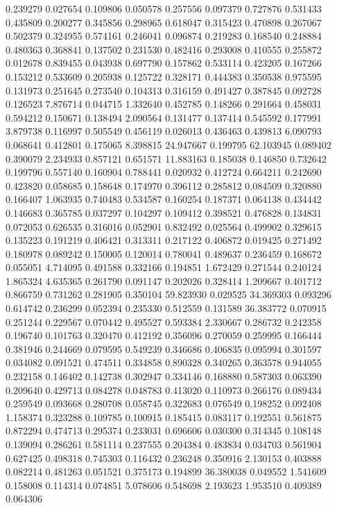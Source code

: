 0.239279
0.027654
0.109806
0.050578
0.257556
0.097379
0.727876
0.531433
0.435809
0.200277
0.345856
0.298965
0.618047
0.315423
0.470898
0.267067
0.502379
0.324955
0.574161
0.246041
0.096874
0.219283
0.168540
0.248884
0.480363
0.368841
0.137502
0.231530
0.482416
0.293008
0.410555
0.255872
0.012678
0.839455
0.043938
0.697790
0.157862
0.533114
0.423205
0.167266
0.153212
0.533609
0.205938
0.125722
0.328171
0.444383
0.350538
0.975595
0.131973
0.251645
0.273540
0.104313
0.316159
0.491427
0.387845
0.092728
0.126523
7.876714
0.044715
1.332640
0.452785
0.148266
0.291664
0.458031
0.594212
0.150671
0.138494
2.090564
0.131477
0.137414
0.545592
0.177991
3.879738
0.116997
0.505549
0.456119
0.026013
0.436463
0.439813
6.090793
0.068641
0.412801
0.175065
8.398815
24.947667
0.199795
62.103945
0.089402
0.390079
2.234933
0.857121
0.651571
11.883163
0.185038
0.146850
0.732642
0.199796
0.557140
0.160904
0.788441
0.020932
0.412724
0.664211
0.242690
0.423820
0.058685
0.158648
0.174970
0.396112
0.285812
0.084509
0.320880
0.166407
1.063935
0.740483
0.534587
0.160254
0.187371
0.064138
0.434442
0.146683
0.365785
0.037297
0.104297
0.109412
0.398521
0.476828
0.134831
0.072053
0.626535
0.316016
0.052901
0.832492
0.025564
0.499902
0.329615
0.135223
0.191219
0.406421
0.313311
0.217122
0.406872
0.019425
0.271492
0.180978
0.089242
0.150005
0.120014
0.780041
0.489637
0.236459
0.168672
0.055051
4.714095
0.491588
0.332166
0.194851
1.672429
0.271544
0.240124
1.865324
4.635365
0.261790
0.091147
0.202026
0.328414
1.209667
0.401712
0.866759
0.731262
0.281905
0.350104
59.823930
0.029525
34.369303
0.093296
0.614742
0.236299
0.052394
0.235330
0.512559
0.131589
36.383772
0.070915
0.251244
0.229567
0.070442
0.495527
0.593384
2.330667
0.286732
0.242358
0.196740
0.101763
0.320470
0.412192
0.356096
0.270059
0.259995
0.166444
0.381946
0.244669
0.079595
0.549239
0.346686
0.406835
0.095994
0.301597
0.034082
0.091521
0.474511
0.334858
0.890328
0.340265
0.363578
0.944055
0.232158
0.146402
0.142738
0.302947
0.334146
0.168880
0.587303
0.063390
0.209640
0.429713
0.084278
0.048783
0.413020
0.110973
0.266176
0.089434
0.259549
0.093668
0.280708
0.058745
0.322683
0.076549
0.198252
0.092408
1.158374
0.323288
0.109785
0.100915
0.185415
0.083117
0.192551
0.561875
0.872294
0.474713
0.295374
0.233031
0.696606
0.030300
0.314345
0.108148
0.139094
0.286261
0.581114
0.237555
0.204384
0.483834
0.034703
0.561904
0.627425
0.498318
0.745303
0.116432
0.236248
0.350916
2.130153
0.403888
0.082214
0.481263
0.051521
0.375173
0.194899
36.380038
0.049552
1.541609
0.158008
0.114314
0.074851
5.078606
0.548698
2.193623
1.953510
0.409389
0.064306
